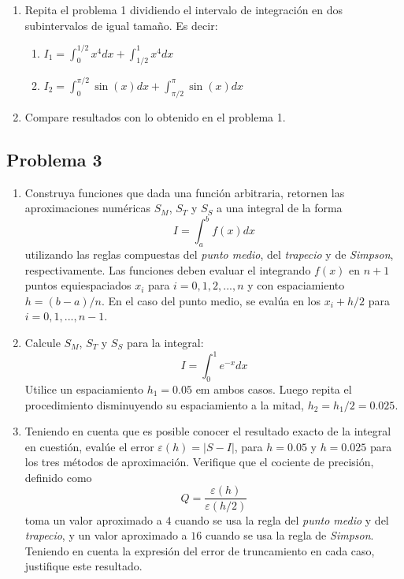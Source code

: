 \documentclass[11pt]{article}
\begin{document}
\begin{enumerate}
\def\labelenumi{\arabic{enumi}.}
\item
  Repita el problema 1 dividiendo el intervalo de integración en dos
  subintervalos de igual tamaño. Es decir:

  \begin{enumerate}
  \def\labelenumii{\alph{enumii}.}
  \item
    \(I_1=\int_0^{1/2} x^4 dx+ \int_{1/2}^1 x^4 dx\)
  \item
    \(I_2=\int_0^{\pi/2}\sin{(x)}dx+\int_{\pi/2}^{\pi}\sin{(x)} dx\)
  \end{enumerate}
\item
  Compare resultados con lo obtenido en el problema 1.
\end{enumerate}

    \hypertarget{problema-3}{%
\subsection*{Problema 3}\label{problema-3}}

\begin{enumerate}
\def\labelenumi{\arabic{enumi}.}
\item
  Construya funciones que dada una función arbitraria, retornen las
  aproximaciones numéricas \(S_M\), \(S_T\) y \(S_S\) a una integral de
  la forma \[
  I = \int_a ^b f(x) dx
  \] utilizando las reglas compuestas del \emph{punto medio}, del
  \emph{trapecio} y de \emph{Simpson}, respectivamente. Las funciones
  deben evaluar el integrando \(f(x)\) en \(n+1\) puntos equiespaciados
  \(x_i\) para \(i=0,1,2,...,n\) y con espaciamiento \(h=(b-a)/n\). En
  el caso del punto medio, se evalúa en los \(x_i+h/2\) para
  \(i=0,1,...,n-1\).
\item
  Calcule \(S_M\), \(S_T\) y \(S_S\) para la integral: \[
  I = \int _0 ^1 e^{-x} dx
  \] Utilice un espaciamiento \(h_1=0.05\) em ambos casos. Luego repita
  el procedimiento disminuyendo su espaciamiento a la mitad,
  \(h_2=h_1/2=0.025\).
\item
  Teniendo en cuenta que es posible conocer el resultado exacto de la
  integral en cuestión, evalúe el error \(\varepsilon(h)=|S-I|\), para
  \(h=0.05\) y \(h=0.025\) para los tres métodos de aproximación.
  Verifique que el cociente de precisión, definido como \[
  Q = \frac{\varepsilon(h)}{\varepsilon(h/2)}
  \] toma un valor aproximado a \(4\) cuando se usa la regla del
  \emph{punto medio} y del \emph{trapecio}, y un valor aproximado a
  \(16\) cuando se usa la regla de \emph{Simpson}. Teniendo en cuenta la
  expresión del error de truncamiento en cada caso, justifique este
  resultado.
\end{enumerate}
\end{document}
